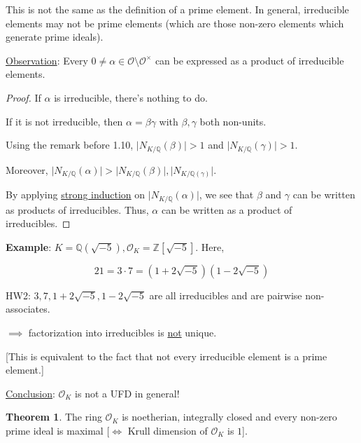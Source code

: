 \documentclass[openany]{amsbook}
\numberwithin{section}{chapter}
\theoremstyle{definition}
\newtheorem{theorem}{Theorem}[chapter]
\begin{document}
This is not the same as the definition of a prime element. In general, irreducible elements may not be prime elements (which are those non-zero elements which generate prime ideals).

\underline{Observation}: Every \(0 \neq \alpha \in \mathcal{O}  \setminus \mathcal{O} ^\times\) can be expressed as a product of irreducible elements.

\begin{proof}
    If \(\alpha\) is irreducible, there's nothing to do.

    If it is not irreducible, then \(\alpha = \beta \gamma\) with \(\beta, \gamma\) both non-units.

    Using the remark before 1.10, \(\vert N_{K / \mathbb{Q}}(\beta) \vert > 1\) and \(\vert N_{K / \mathbb{Q}}(\gamma) \vert > 1\).

    Moreover, \(\vert N_{K / \mathbb{Q}}(\alpha) \vert > \vert N_{K / \mathbb{Q}}(\beta) \vert, \vert N_{K / \mathbb{Q}(\gamma)} \vert\). 

    By applying \underline{strong induction} on \(\vert N_{K / \mathbb{Q}}(\alpha) \vert\), we see that \(\beta \) and \(\gamma\) can be written as products of irreducibles. Thus, \(\alpha\) can be written as a product of irreducibles.  
\end{proof}

\textbf{Example}: \(K = \mathbb{Q} (\sqrt{-5}), \mathcal{O}_K = \mathbb{Z} [\sqrt{-5}]\). Here,

\[
    21 = 3 \cdot 7 = (1 + 2 \sqrt{-5})(1 - 2 \sqrt{-5})
\]

HW2: \(3, 7, 1 + 2 \sqrt{-5}, 1 - 2 \sqrt{-5}\) are all irreducibles and are pairwise non-associates.

\(\implies\) factorization into irreducibles is \underline{not} unique.

[This is equivalent to the fact that not every irreducible element is a prime element.]

\underline{Conclusion}: \(\mathcal{O}_K\) is not a UFD in general!

\begin{theorem}
    The ring \(\mathcal{O}_K\) is noetherian, integrally closed and every non-zero prime ideal is maximal [\(\iff \) Krull dimension of \(\mathcal{O}_K\) is \(1\)].
\end{theorem}
\end{document}
